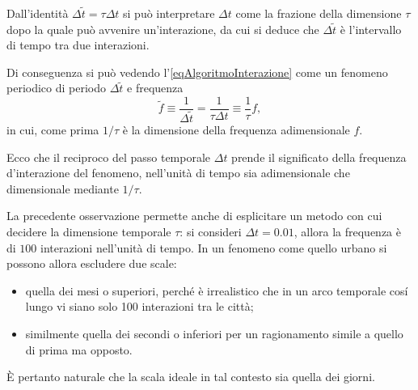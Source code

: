                \begin{oss}
                    Dall'identità \(\Delta\tilde t=\tau\Delta t\) si può interpretare \(\Delta t\) come la frazione della dimensione \(\tau\) dopo la quale può avvenire un'interazione, da cui si deduce che \(\Delta\tilde t\) è l'intervallo di tempo tra due interazioni.
                   
                    Di conseguenza si può vedendo l'\ref{eqAlgoritmoInterazione} come un fenomeno periodico di periodo \(\Delta\tilde t\) e frequenza
                    \begin{equation*}
                        \tilde f\equiv\frac1{\Delta\tilde t}=\frac1{\tau\Delta t}\equiv\frac1\tau f,
                    \end{equation*}
                    in cui, come prima \(1/\tau\) è la dimensione della frequenza adimensionale \(f\).

                    Ecco che il reciproco del passo temporale \(\Delta t\) prende il significato della frequenza d'interazione del fenomeno, nell'unità di tempo sia adimensionale che dimensionale mediante \(1/\tau\).
                \end{oss}

                \begin{oss}
                    La precedente osservazione permette anche di esplicitare un metodo con cui decidere la dimensione temporale \(\tau\): si consideri \(\Delta t=0.01\), allora la frequenza è di \(100\) interazioni nell'unità di tempo. In un fenomeno come quello urbano si possono allora escludere due scale:

                    \begin{itemize}[
                        label=\(\diamond\),
                        itemsep=0.1em,
                    ]
                        \item quella dei mesi o superiori, perché è irrealistico che in un arco temporale cosí lungo vi siano solo 100 interazioni tra le città;
                        \item similmente quella dei secondi o inferiori per un ragionamento simile a quello di prima ma opposto.
                    \end{itemize}

                    È pertanto naturale che la scala ideale in tal contesto sia quella dei giorni.
                \end{oss}

